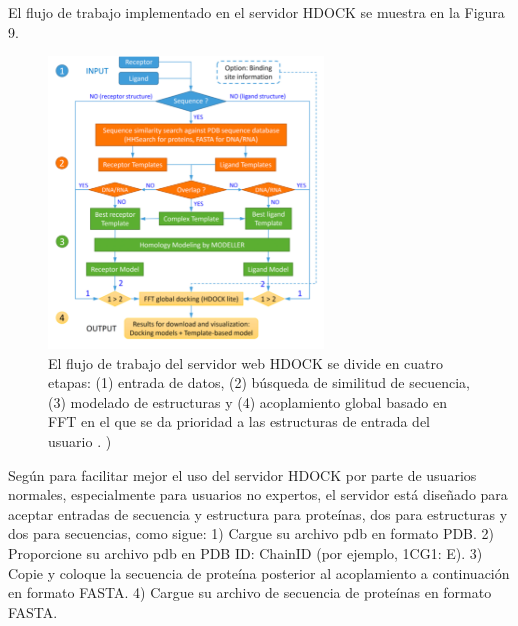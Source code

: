\documentclass[11pt, letterpaper, spanish]{article}
\begin{document}
{{    \par{El flujo de trabajo implementado en el servidor HDOCK se muestra en la Figura 9.}
    \begin{figure}
	    \centering
		\caption{El flujo de trabajo del servidor web HDOCK se divide en cuatro etapas: (1) entrada de datos, (2) búsqueda de similitud de secuencia, (3) modelado de estructuras y (4) acoplamiento global basado en FFT en el que se da prioridad a las estructuras de entrada del usuario . \cite{Yan_2017})}
		\includegraphics[width=0.65\textwidth]{Imagen 2.png}
	\end{figure}\textbf{}

\par{Según \cite{Jo_2017} para facilitar mejor el uso del servidor HDOCK por parte de usuarios normales, especialmente para usuarios no expertos, el servidor está diseñado para aceptar entradas de secuencia y estructura para proteínas, dos para estructuras y dos para secuencias, como sigue:
1) Cargue su archivo pdb en formato PDB.
2) Proporcione su archivo pdb en PDB ID: ChainID (por ejemplo, 1CG1: E).
3) Copie y coloque la secuencia de proteína posterior al acoplamiento a continuación en formato FASTA.
4) Cargue su archivo de secuencia de proteínas en formato FASTA.}

}}
\end{document}
